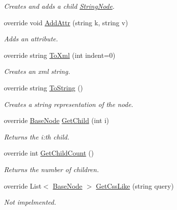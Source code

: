 \begin{DoxyCompactItemize}
\begin{DoxyCompactList}\small\item\em Creates and adds a child \hyperlink{class_x_m_leru_handleru_1_1_string_node}{String\+Node}. \end{DoxyCompactList}\item 
override void \hyperlink{class_x_m_leru_handleru_1_1_node_af847932f7294cc39d8a3f6f89062a950}{Add\+Attr} (string k, string v)
\begin{DoxyCompactList}\small\item\em Adds an attribute. \end{DoxyCompactList}\item 
override string \hyperlink{class_x_m_leru_handleru_1_1_node_a29a231aa34d23b491600f13916bcb5de}{To\+Xml} (int indent=0)
\begin{DoxyCompactList}\small\item\em Creates an xml string. \end{DoxyCompactList}\item 
override string \hyperlink{class_x_m_leru_handleru_1_1_node_aa35d6d52814845f0c3f72ccdcdc20d13}{To\+String} ()
\begin{DoxyCompactList}\small\item\em Creates a string representation of the node. \end{DoxyCompactList}\item 
override \hyperlink{class_x_m_leru_handleru_1_1_base_node}{Base\+Node} \hyperlink{class_x_m_leru_handleru_1_1_node_a2e756780a13a8ce3f8b84aaa61a6c0cc}{Get\+Child} (int i)
\begin{DoxyCompactList}\small\item\em Returns the i\+:th child. \end{DoxyCompactList}\item 
override int \hyperlink{class_x_m_leru_handleru_1_1_node_a8d024d88abb37f16a7b46cb5bfdf5345}{Get\+Child\+Count} ()
\begin{DoxyCompactList}\small\item\em Returns the number of children. \end{DoxyCompactList}\item 
override List$<$ \hyperlink{class_x_m_leru_handleru_1_1_base_node}{Base\+Node} $>$ \hyperlink{class_x_m_leru_handleru_1_1_node_a2d2c1b582bd36ee9241763d108bd82e0}{Get\+Css\+Like} (string query)
\begin{DoxyCompactList}\small\item\em Not impelmented. \end{DoxyCompactList}\end{DoxyCompactItemize}
